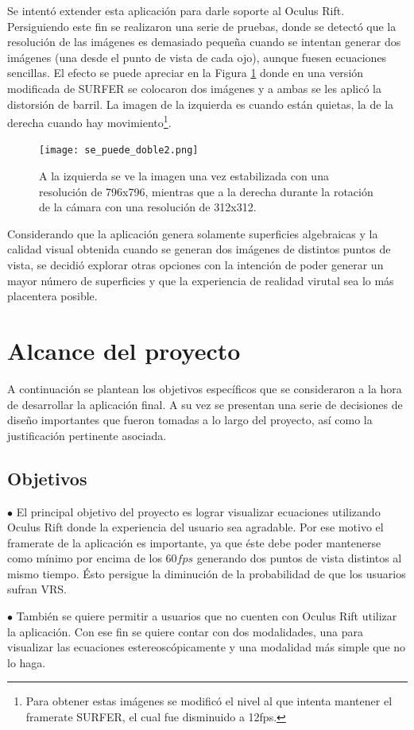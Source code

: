 \documentclass[12pt]{article}
\begin{document}
Se intentó extender esta aplicación para darle soporte al Oculus Rift. Persiguiendo este fin se realizaron una serie de pruebas, donde se detectó que la resolución de las imágenes es demasiado pequeña cuando se intentan generar dos imágenes (una desde el punto de vista de cada ojo), aunque fuesen ecuaciones sencillas. El efecto se puede apreciar en la Figura \ref{malaRES2} donde en una versión modificada de SURFER se colocaron dos imágenes y a ambas se les aplicó la distorsión de barril. La imagen de la izquierda es cuando están quietas, la de la derecha cuando hay movimiento\footnote{Para obtener estas imágenes se modificó el nivel al que intenta mantener el framerate SURFER, el cual fue disminuido a 12fps.}.
\clearpage
\begin{figure}[h!]
\texttt{[image: se\_puede\_doble2.png]}
\caption{A la izquierda se ve la imagen una vez estabilizada con una resolución de 796x796, mientras que a la derecha durante la rotación de la cámara con una resolución de 312x312.}
\label{malaRES2}
\end{figure}
Considerando que la aplicación genera solamente superficies algebraicas y la calidad visual obtenida cuando se generan dos imágenes de distintos puntos de vista, se decidió explorar otras opciones con la intención de poder generar un mayor número de superficies y que la experiencia de realidad virutal sea lo más placentera posible.
\clearpage
\section{Alcance del proyecto}
\noindent A continuación se plantean los objetivos específicos que se consideraron a la hora de desarrollar la aplicación final. A su vez se presentan una serie de decisiones de diseño importantes que fueron tomadas a lo largo del proyecto, así como la justificación pertinente asociada.
\subsection{Objetivos}
$\bullet$ El principal objetivo del proyecto es lograr visualizar ecuaciones utilizando Oculus Rift donde  la experiencia del usuario sea agradable. Por ese motivo el framerate de la aplicación es importante, ya que éste debe poder mantenerse como mínimo por encima de los $60 fps$ generando dos puntos de vista distintos al mismo tiempo. Ésto persigue la diminución de la probabilidad de que los usuarios sufran VRS. 

$\bullet$ También se quiere permitir a usuarios que no cuenten con Oculus Rift utilizar la aplicación. Con ese fin se quiere contar con dos modalidades, una para visualizar las ecuaciones estereoscópicamente y una modalidad más simple que no lo haga.
\end{document}
